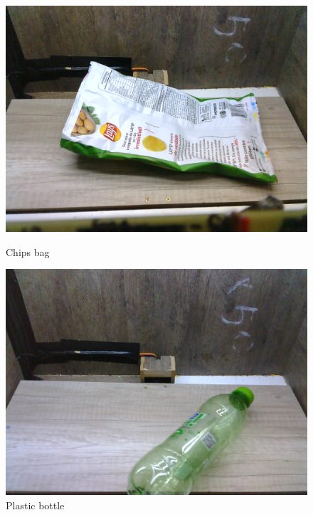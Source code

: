 \documentclass[a4paper,11pt]{article}
\begin{document}
\begin{figure}[H]
  \centering
  \begin{minipage}{.5\textwidth}
    \centering
    \includegraphics[width=.8\linewidth]{Figures/Classificiations/ChipsBag.png}
    \caption{\small{Chips bag}}
    \label{fig:chips}
  \end{minipage}%
  \begin{minipage}{.5\textwidth}
    \centering
    \includegraphics[width=.8\linewidth]{Figures/Classificiations/plasticBottle.png}
    \caption{\small{Plastic bottle}}
    \label{fig:plasticbottle}
  \end{minipage}
\end{figure}
\end{document}
